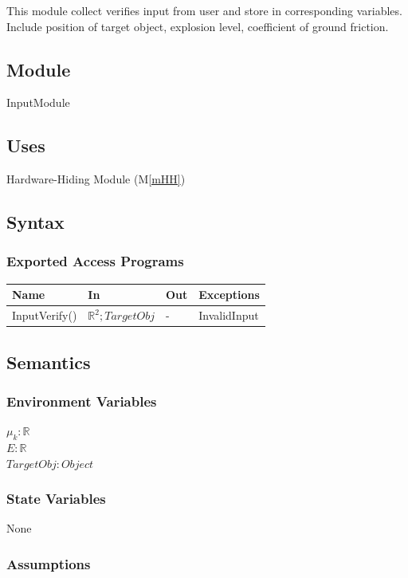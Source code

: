 \documentclass[12pt, titlepage]{article}
\newcommand{\mref}[1]{M\ref{#1}}
\begin{document}
This module collect verifies input from user and store in corresponding variables. Include position of target object, explosion level, coefficient of ground friction.

\subsection{Module}

InputModule

\subsection{Uses}

Hardware-Hiding Module (\mref{mHH})
\subsection{Syntax}

\subsubsection{Exported Access Programs}

\begin{center}
\begin{tabular}{p{2cm} p{4cm} p{4cm} p{2cm}}
\hline
\textbf{Name} & \textbf{In} & \textbf{Out} & \textbf{Exceptions} \\
\hline
InputVerify() &  $\mathbb{R}^{2}; TargetObj$ & - & InvalidInput\\
\hline
\end{tabular}
\end{center}

\subsection{Semantics}

\subsubsection{Environment Variables}

$\mu_{k}: \mathbb{R}$\\
$E: \mathbb{R}$\\
$TargetObj: Object$
\subsubsection{State Variables}
None
\subsubsection{Assumptions}
\end{document}
